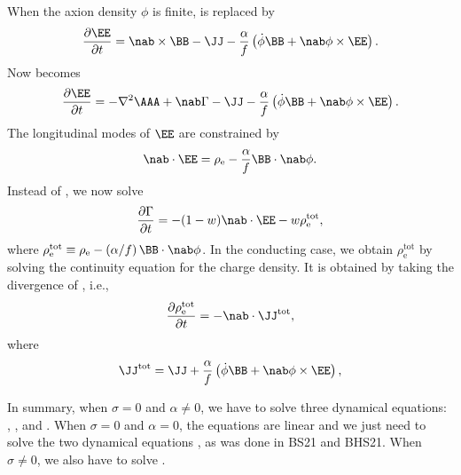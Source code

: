 \documentclass{article}
\begin{document}
When the axion density $\phi$ is finite,  is replaced by
\begin{equation}
\frac{\partial\EE}{\partial t}=\nab\times\BB-\JJ
-\frac{\alpha}{f}\left(\dot{\phi}\BB+\nab\phi\times\EE\right).
\label{dEdt2}
\end{equation}
Now  becomes
\begin{equation}
\frac{\partial\EE}{\partial t}=-\nabla^2\AAA+\nab \Gamma-\JJ
-\frac{\alpha}{f}\left(\dot{\phi}\BB+\nab\phi\times\EE\right).
\label{dE2dt2}
\end{equation}
The longitudinal modes of $\EE$ are constrained by
\begin{equation}
\nab\cdot\EE=\rho_\mathrm{e}-\frac{\alpha}{f}\BB\cdot\nab\phi.
\end{equation}
Instead of , we now solve
\begin{equation}
\frac{\partial\Gamma}{\partial t}=-(1-w)\nab\cdot\EE
-w\rho_\mathrm{e}^\mathrm{tot},
\label{dG2dt2}
\end{equation}
where $\rho_\mathrm{e}^\mathrm{tot}\equiv\rho_\mathrm{e}-(\alpha/f)\,\BB\cdot\nab\phi$.
In the conducting case, we obtain $\rho_\mathrm{e}^\mathrm{tot}$ by solving the continuity
equation for the charge density.
It is obtained by taking the divergence of , i.e.,
\begin{equation}
\frac{\partial\rho_\mathrm{e}^\mathrm{tot}}{\partial t}=-\nab\cdot\JJ^\mathrm{tot},
\label{drhoedt}
\end{equation}
where
\begin{equation}
\JJ^\mathrm{tot}=\JJ+\frac{\alpha}{f}\left(\dot{\phi}\BB+\nab\phi\times\EE\right),
\label{Jtot}
\end{equation}

In summary, when $\sigma=0$ and $\alpha\neq0$, we have to solve three dynamical equations:
, , and .
When $\sigma=0$ and $\alpha=0$, the equations are linear and we just need
to solve the two dynamical equations , as was done in
BS21 and BHS21.
When $\sigma\neq0$, we also have to solve .
\end{document}
